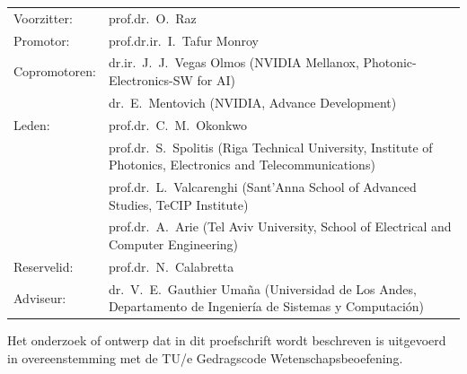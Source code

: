 {\small
\begin{tabular}{@{}p{}@{\hspace{1em}}>{\raggedright\arraybackslash}p{}@{}}
  Voorzitter:    & prof.dr.~O.~Raz\\
  Promotor:      & prof.dr.ir.~I.~Tafur Monroy\\
  Copromotoren:  & dr.ir.~J.~J.~Vegas Olmos (NVIDIA Mellanox, Photonic-Electronics-SW for AI)\\
                 & dr.~E.~Mentovich (NVIDIA, Advance Development)\\
  Leden:         & prof.dr.~C.~M.~Okonkwo\\
                 & prof.dr.~S.~Spolitis (Riga Technical University, Institute of Photonics, Electronics and Telecommunications)\\
                 & prof.dr.~L.~Valcarenghi (Sant'Anna School of Advanced Studies, TeCIP Institute)\\
                 & prof.dr.~A.~Arie (Tel Aviv University, School of Electrical and Computer Engineering)\\
  Reservelid:    & prof.dr.~N.~Calabretta\\
  Adviseur:      & dr.~V.~E.~Gauthier Uma\~na (Universidad de Los Andes, Departamento de Ingenier\'ia de Sistemas y Computaci\'on)\\
\end{tabular}
}

\vfill

\noindent Het onderzoek of ontwerp dat in dit proefschrift wordt beschreven is uitgevoerd in overeenstemming met de TU/e Gedragscode Wetenschapsbeoefening.

\cleardoublepage
